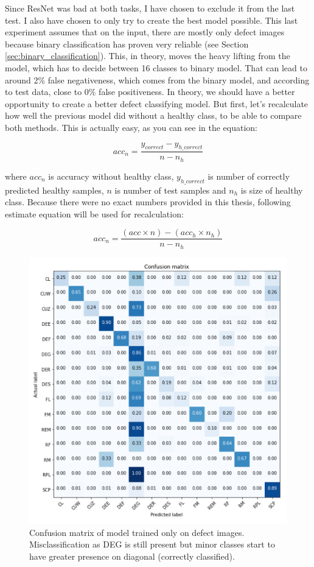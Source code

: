 \documentclass[thesis=B,english]{FITthesis}[2019/12/23]
\begin{document}
Since ResNet was bad at both tasks, I have chosen to exclude it from the last test. I also have chosen to only try to create the best model possible. This last experiment assumes that on the input, there are mostly only defect images because binary classification has proven very reliable (see Section \ref{sec:binary_classification}). This, in theory, moves the heavy lifting from the model, which has to decide between 16 classes to binary model. That can lead to around 2\% false negativeness, which comes from the binary model, and according to test data, close to 0\% false positiveness. In theory, we should have a better opportunity to create a better defect classifying model. But first, let's recalculate how well the previous model did without a healthy class, to be able to compare both methods. This is actually easy, as you can see in the equation:

$$acc_n = \frac{y_{correct} - y_{h\_correct}}{n - n_h}$$

where $acc_n$ is accuracy without healthy class, $y_{h\_correct}$ is number of correctly predicted healthy samples, $n$ is number of test samples and $n_h$ is size of healthy class. Because there were no exact numbers provided in this thesis, following estimate equation will be used for recalculation:

$$acc_{n} = \frac{(acc \times n) - (acc_h \times n_h)}{n - n_{h}}$$

\begin{figure}
    \centering
    \includegraphics[width=.8\textwidth]{CategoricalVGGTwoModels.PNG}
    \caption[Confusion matrix of model trained only on defect images]{Confusion matrix of model trained only on defect images. Misclassification as DEG is still present but minor classes start to have greater presence on diagonal (correctly classified). }
    \label{fig:categorical_combination}
\end{figure}
\end{document}
